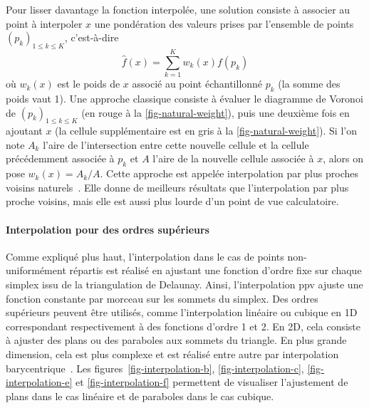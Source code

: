 Pour lisser davantage la fonction interpolée, une solution consiste à associer au point à interpoler $x$ une pondération des valeurs prises par l'ensemble de points $(p_k)_{1\leq k\leq K}$, c'est-à-dire
\begin{equation}\label{eq-weighted-interp}
    \hat{f}(x) = \sum_{k=1}^K w_k(x) f(p_k)
\end{equation}
où $w_k(x)$ est le poids de $x$ associé au point échantillonné $p_k$ (la somme des poids vaut 1). Une approche classique consiste à évaluer le diagramme de Voronoi de $(p_k)_{1\leq k\leq K}$ (en rouge à la \cref{fig-natural-weight}), puis une deuxième fois en ajoutant $x$ (la cellule supplémentaire est en gris à la \cref{fig-natural-weight}). Si l'on note $A_k$ l'aire de l'intersection entre cette nouvelle cellule et la cellule précédemment associée à $p_k$ et $A$ l'aire de la nouvelle cellule associée à $x$, alors on pose $w_k(x)=A_k/A$. Cette approche est appelée interpolation par plus proches voisins naturels~\cite{sibson1981interpreting,cazals2006delaunay}. Elle donne de meilleurs résultats que l'interpolation par plus proche voisins, mais elle est aussi plus lourde d'un point de vue calculatoire.

\paragraph{Interpolation pour des ordres supérieurs} Comme expliqué plus haut, l'interpolation dans le cas de points non-uniformément répartis est réalisé en ajustant une fonction d'ordre fixe sur chaque simplex issu de la triangulation de Delaunay. Ainsi, l'interpolation \gls{ppv} ajuste une fonction constante par morceau sur les sommets du simplex. Des ordres supérieurs peuvent être utilisés, comme l'interpolation linéaire ou cubique en 1D correspondant respectivement à des fonctions d'ordre 1 et 2. En 2D, cela consiste à ajuster des plans ou des paraboles aux sommets du triangle. En plus grande dimension, cela est plus complexe et est réalisé entre autre par interpolation barycentrique~\cite{hormann2014barycentric}. Les figures~\ref{fig-interpolation-b}, \ref{fig-interpolation-c}, \ref{fig-interpolation-e} et \ref{fig-interpolation-f} permettent de visualiser l'ajustement de plans dans le cas linéaire et de paraboles dans le cas cubique.
  
